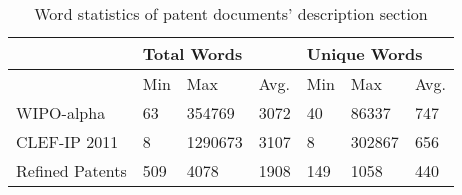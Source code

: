 \begin{table}[ht]
\centering
\begin{tabular}{@{}lllllll@{}}
\toprule
                & \multicolumn{3}{l|}{Total Words}                                                & \multicolumn{3}{l}{Unique Words}                           \\ \midrule
                & \multicolumn{1}{l|}{Min} & \multicolumn{1}{l|}{Max} & \multicolumn{1}{l|}{Avg.} & \multicolumn{1}{l|}{Min} & \multicolumn{1}{l|}{Max} & Avg. \\ \midrule
WIPO-alpha      & 63                       & 354769                   & 3072                      & 40                       & 86337                    & 747  \\
CLEF-IP 2011    & 8                        & 1290673                  & 3107                      & 8                        & 302867                   & 656  \\
Refined Patents & 509                      & 4078                     & 1908                      & 149                      & 1058                     & 440  \\ \bottomrule
\end{tabular}
\caption{Word statistics of patent documents' description section}
\label{tab:description_word_stats}
\end{table}